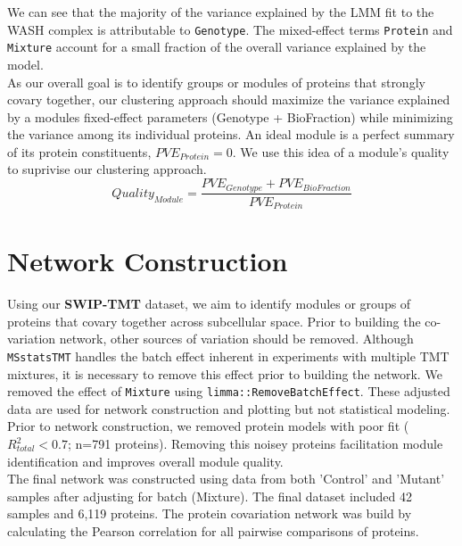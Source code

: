 \documentclass[11pt]{elife}\usepackage[]{graphicx}\usepackage[]{color}
\begin{document}
We can see that the majority of the variance explained by the LMM fit to the
WASH complex is attributable to \texttt{Genotype}. The mixed-effect terms
\texttt{Protein} and \texttt{Mixture} account for a small fraction of the 
overall variance explained by the model.\\

As our overall goal is to identify groups or modules of proteins that strongly
covary together, our clustering approach should maximize the variance explained
by a modules fixed-effect parameters (Genotype + BioFraction) while minimizing 
the variance among its individual proteins. 
An ideal module is a perfect summary of its protein constituents, 
$PVE_{Protein}=0$. We use this idea of a module's quality to suprivise our 
clustering approach.\\

\begin{equation}
	Quality_{Module}=\frac{PVE_{Genotype} + PVE_{BioFraction}}{PVE_{Protein}}
\end{equation}


\section{Network Construction}

Using our \textbf{SWIP-TMT} dataset, we aim to identify modules or groups of
proteins that covary together across subcellular space. Prior to building the
co-variation network, other sources of variation should be removed. Although
\texttt{MSstatsTMT} handles the batch effect inherent in experiments with
multiple TMT mixtures, it is necessary to remove this effect prior to building
the network. We removed the effect of \texttt{Mixture} using
\texttt{limma::RemoveBatchEffect}.  These adjusted data are used for network
construction and plotting but not statistical modeling.\\

Prior to network construction, we removed protein models with poor fit 
($R^2_{total}<0.7$; n=791 proteins). Removing this noisey proteins facilitation
module identification and improves overall module quality.\\

The final network was constructed using data from both 'Control' and 'Mutant' 
samples after adjusting for batch (Mixture). The final dataset included 
42 samples and 6,119 proteins. The protein covariation network was build by
calculating the Pearson correlation for all pairwise comparisons of proteins.\\
\end{document}
